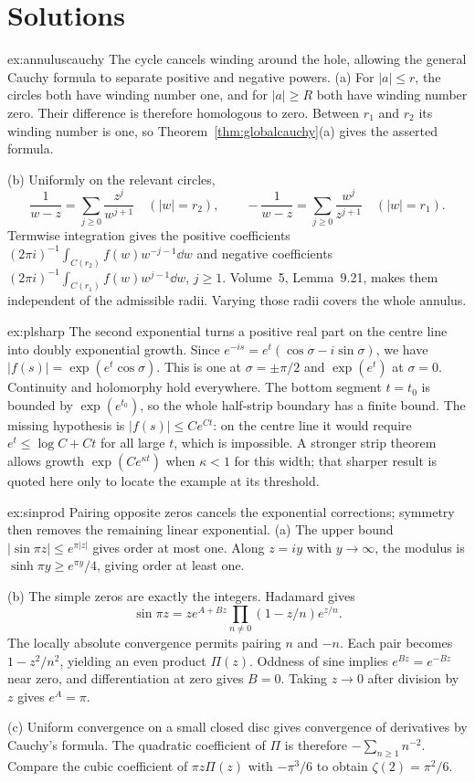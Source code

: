 \section{Solutions}
\begin{solution}{ex:annuluscauchy}
\idea The cycle cancels winding around the hole, allowing the general Cauchy formula to separate positive and negative powers.
\writeup (a) For $|a|\le r$, the circles both have winding number one, and for $|a|\ge R$ both have winding number zero. Their difference is therefore homologous to zero. Between $r_1$ and $r_2$ its winding number is one, so Theorem~\ref{thm:globalcauchy}(a) gives the asserted formula.

(b) Uniformly on the relevant circles,
\[\frac1{w-z}=\sum_{j\ge0}\frac{z^j}{w^{j+1}}\quad(|w|=r_2),\qquad
-\frac1{w-z}=\sum_{j\ge0}\frac{w^j}{z^{j+1}}\quad(|w|=r_1).
\]
Termwise integration gives the positive coefficients $(2\pi i)^{-1}\int_{C(r_2)}f(w)w^{-j-1}\dd w$ and negative coefficients $(2\pi i)^{-1}\int_{C(r_1)}f(w)w^{j-1}\dd w$, $j\ge1$. Volume~5, Lemma~9.21, makes them independent of the admissible radii. Varying those radii covers the whole annulus.
\end{solution}
\begin{solution}{ex:plsharp}
\idea The second exponential turns a positive real part on the centre line into doubly exponential growth.
\writeup Since $e^{-is}=e^t(\cos\sigma-i\sin\sigma)$, we have $|f(s)|=\exp(e^t\cos\sigma)$. This is one at $\sigma=\pm\pi/2$ and $\exp(e^t)$ at $\sigma=0$. Continuity and holomorphy hold everywhere. The bottom segment $t=t_0$ is bounded by $\exp(e^{t_0})$, so the whole half-strip boundary has a finite bound. The missing hypothesis is $|f(s)|\le Ce^{Ct}$: on the centre line it would require $e^t\le\log C+Ct$ for all large $t$, which is impossible. A stronger strip theorem allows growth $\exp(Ce^{\kappa t})$ when $\kappa<1$ for this width; that sharper result is quoted here only to locate the example at its threshold.
\end{solution}
\begin{solution}{ex:sinprod}
\idea Pairing opposite zeros cancels the exponential corrections; symmetry then removes the remaining linear exponential.
\writeup (a) The upper bound $|\sin\pi z|\le e^{\pi|z|}$ gives order at most one. Along $z=iy$ with $y\to\infty$, the modulus is $\sinh\pi y\ge e^{\pi y}/4$, giving order at least one.

(b) The simple zeros are exactly the integers. Hadamard gives
\[\sin\pi z=ze^{A+Bz}\prod_{n\ne0}(1-z/n)e^{z/n}.
\]
The locally absolute convergence permits pairing $n$ and $-n$. Each pair becomes $1-z^2/n^2$, yielding an even product $\Pi(z)$. Oddness of sine implies $e^{Bz}=e^{-Bz}$ near zero, and differentiation at zero gives $B=0$. Taking $z\to0$ after division by $z$ gives $e^A=\pi$.

(c) Uniform convergence on a small closed disc gives convergence of derivatives by Cauchy's formula. The quadratic coefficient of $\Pi$ is therefore $-\sum_{n\ge1}n^{-2}$. Compare the cubic coefficient of $\pi z\Pi(z)$ with $-\pi^3/6$ to obtain $\zeta(2)=\pi^2/6$.
\end{solution}
